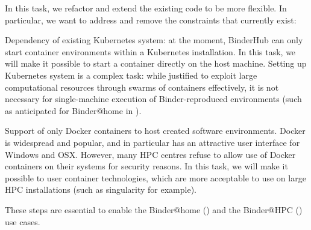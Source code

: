 \begin{task}[
  title=Reducing technical constraints to enable broader usage,
  id=constraints,
  lead=SRL,
  PM=14,
  partners={MP,QS}
]

In this task, we refactor and extend the existing code to be more flexible. In
particular, we want to address and remove the constraints that currently exist:

\begin{compactitem}
\item Dependency of existing Kubernetes system: at the moment, BinderHub can
  only start container environments within a Kubernetes installation. In this
  task, we will make it possible to start a container directly on the host
  machine. Setting up Kubernetes system is a complex task: while justified to
  exploit large computational resources through swarms of containers
  effectively, it is not necessary for single-machine execution of
  Binder-reproduced environments (such as anticipated for Binder@home in
  ).
\item Support of only Docker containers to host created software environments.
  Docker is widespread and popular, and in particular has an attractive user
  interface for Windows and OSX. However, many HPC centres refuse to allow use
  of Docker containers on their systems for security reasons. In this task, we
  will make it possible to user container technologies, which are more
  acceptable to use on large HPC installations (such as singularity for
  example).
  \end{compactitem}

  These steps are essential to enable the Binder@home
  () and the Binder@HPC
  () use cases.

\end{task}
